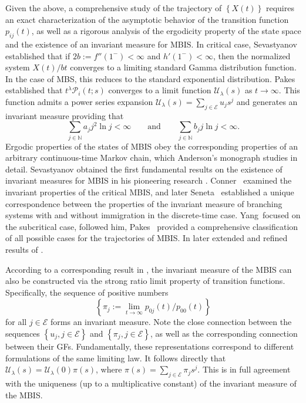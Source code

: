 \documentclass[10pt,reqno]{amsart}
\theoremstyle{definition}
\numberwithin{equation}{section}
\begin{document}
    Given the above, a comprehensive study of the trajectory of $\left\{X(t)\right\}$ requires an exact characterization
    of the asymptotic behavior of the transition function ${{p}_{ij}}(t)$, as well as a rigorous analysis of the ergodicity
    property of the state space and the existence of an invariant measure for MBIS. In critical case,
    Sevastyanov~{\cite{Sev57}} established that if $2b:=f''({{1}^{-}})<\infty$ and $h'({{1}^{-}})<\infty$, then the
    normalized system ${X(t)}/{bt}$ converges to a limiting standard Gamma distribution function. In the case of MBS,
    this reduces to the standard exponential distribution. Pakes~{\cite{Pakes75}} established that
    ${t^{\lambda}}{{\mathcal{P}}_i}(t;s)$ converges to a limit function ${\mathcal{U}}_{\lambda}(s)$ as $t\to\infty$.
    This function admits a power series expansion ${\mathcal{U}}_{\lambda}(s)=\sum_{j\in\mathcal{E}}{u_j{s}^j}$
    and generates an invariant measure providing that
\begin{equation}                              \label{IIB2.5}
    \sum\limits_{j\in \mathbb{N}}{{{a}_{j}}{{j}^{2}}\ln j}<\infty \qquad {\text{and}} \qquad
    \sum\limits_{j\in \mathbb{N}}{{{b}_{j}}j\ln j}<\infty.
\end{equation}
    Ergodic properties of the states of MBIS obey the corresponding properties of an arbitrary continuous-time Markov chain,
    which Anderson's monograph {\cite[Ch.6]{Anderson}} studies in detail. Sevastyanov obtained the first fundamental results
    on the existence of invariant measures for MBIS in his pioneering research {\cite{Sev57}}. Conner~{\cite{Conner67}}
    examined the invariant properties of the critical MBIS, and later Seneta~{\cite{Seneta74}} established a unique
    correspondence between the properties of the invariant measure of branching systems with and without immigration
    in the discrete-time case. Yang~{\cite{Yang72}}focused on the subcritical case, followed him, Pakes~{\cite{Pakes75}}
    provided a comprehensive classification of all possible cases for the trajectories of MBIS.
    In {\cite{LiChPakes12}} later extended and refined results of {\cite{Pakes75}}.

    According to a corresponding result in {\cite{LiChPakes12}}, the invariant measure of the MBIS can also be constructed via the strong ratio limit property of transition functions. Specifically, the sequence of positive numbers
\[
    \left\{{\pi_{j}}:={\lim_{t\to\infty}}{{p_{0j}}(t)}\big/{{p_{00}}(t)}\right\}
\]
    for all $j\in\mathcal{E}$
    forms an invariant measure. Note the close connection between the sequences $\left\{{u_j},j\in\mathcal{E}\right\}$
    and $\left\{{\pi_{j}},j\in\mathcal{E}\right\}$, as well as the corresponding connection between their GFs.
    Fundamentally, these representations correspond to different formulations of the same limiting law. It follows
    directly that ${{\mathcal{U}}_{\lambda}}(s)={{\mathcal{U}}_{\lambda}}(0)\pi(s)$, where
    $\pi(s)=\sum_{j\in\mathcal{E}}{{\pi_{j}}{s^j}}$. This is in full agreement with the
    uniqueness (up to a multiplicative constant) of the invariant measure of the MBIS.
\end{document}

